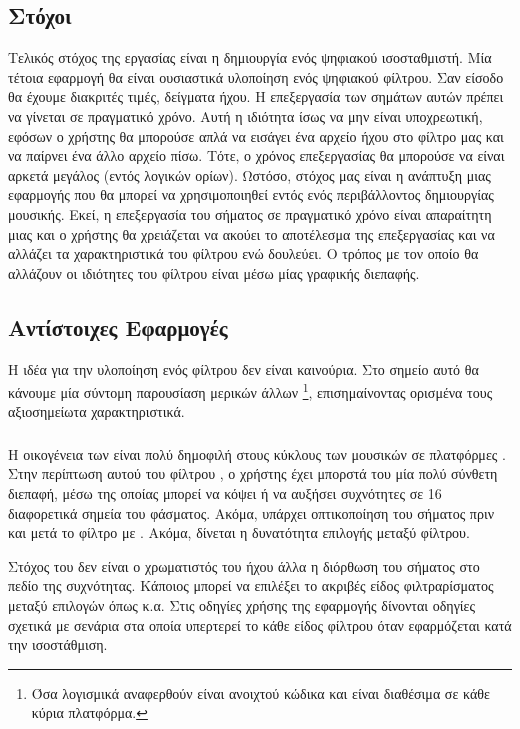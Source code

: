 \documentclass[12pt]{extarticle}
\begin{document}
\subsection{Στόχοι} 

Τελικός στόχος της εργασίας είναι η δημιουργία ενός ψηφιακού ισοσταθμιστή. 
Μία τέτοια εφαρμογή θα είναι ουσιαστικά υλοποίηση ενός ψηφιακού φίλτρου. 
Σαν είσοδο θα έχουμε διακριτές τιμές, δείγματα ήχου. 
Η επεξεργασία των σημάτων αυτών πρέπει να γίνεται σε πραγματικό χρόνο. 
Αυτή η ιδιότητα ίσως να μην είναι υποχρεωτική, εφόσων ο χρήστης 
θα μπορούσε απλά να εισάγει ένα αρχείο ήχου στο φίλτρο μας και να παίρνει ένα 
άλλο αρχείο πίσω. Τότε, ο χρόνος επεξεργασίας θα μπορούσε να είναι αρκετά 
μεγάλος (εντός λογικών ορίων). 
Ωστόσο, στόχος μας είναι η ανάπτυξη μιας εφαρμογής που θα μπορεί να χρησιμοποιηθεί 
εντός ενός περιβάλλοντος δημιουργίας μουσικής. Εκεί, η επεξεργασία του σήματος σε πραγματικό 
χρόνο είναι απαραίτητη μιας και ο χρήστης θα χρειάζεται να ακούει το αποτέλεσμα της επεξεργασίας
και να αλλάζει τα χαρακτηριστικά του φίλτρου ενώ δουλεύει.
Ο τρόπος με τον οποίο θα αλλάζουν οι ιδιότητες του φίλτρου είναι μέσω μίας γραφικής διεπαφής. 

\subsection{Αντίστοιχες Εφαρμογές}

Η ιδέα για την υλοποίηση ενός φίλτρου δεν είναι καινούρια. 
Στο σημείο αυτό θα κάνουμε μία σύντομη 
παρουσίαση μερικών άλλων  \footnote{
Όσα λογισμικά αναφερθούν είναι ανοιχτού κώδικα και είναι διαθέσιμα σε κάθε κύρια πλατφόρμα.
}, επισημαίνοντας ορισμένα τους 
αξιοσημείωτα χαρακτηριστικά.


\subsubsection{}

Η οικογένεια  των  είναι 
πολύ δημοφιλή στους κύκλους των μουσικών σε πλατφόρμες . 
Στην περίπτωση αυτού του φίλτρου \cite{LSPEQ}, ο χρήστης έχει μπορστά του μία 
πολύ σύνθετη διεπαφή, μέσω της οποίας μπορεί να κόψει ή να αυξήσει συχνότητες σε 
16 διαφορετικά σημεία του φάσματος.
Ακόμα, υπάρχει οπτικοποίηση του σήματος
πριν και μετά το φίλτρο με . Ακόμα, δίνεται 
η δυνατότητα επιλογής μεταξύ  φίλτρου.

Στόχος του  δεν είναι ο χρωματιστός του ήχου άλλα 
η διόρθωση του σήματος στο πεδίο της συχνότητας. Κάποιος μπορεί 
να επιλέξει το ακριβές είδος φιλτραρίσματος μεταξύ επιλογών 
όπως  κ.α.
Στις οδηγίες χρήσης της εφαρμογής δίνονται οδηγίες σχετικά με σενάρια στα οποία υπερτερεί το κάθε 
είδος φίλτρου όταν εφαρμόζεται κατά την ισοστάθμιση.
\end{document}

